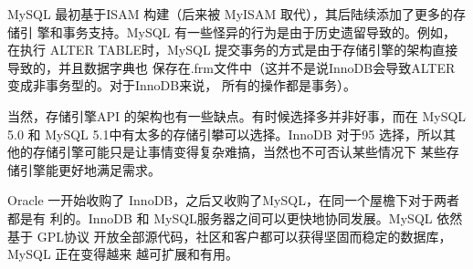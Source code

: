 MySQL 最初基于ISAM 构建（后来被 MyISAM 取代），其后陆续添加了更多的存储引
擎和事务支持。MySQL 有一些怪异的行为是由于历史遗留导致的。例如，在执行 ALTER
TABLE时，MySQL 提交事务的方式是由于存储引擎的架构直接导致的，并且数据字典也
保存在.frm文件中（这并不是说InnoDB会导致ALTER变成非事务型的。对于InnoDB来说，
所有的操作都是事务）。

当然，存储引擎API 的架构也有一些缺点。有时候选择多并非好事，而在 MySQL 5.0 和
MySQL 5.1中有太多的存储引攀可以选择。InnoDB 对于95%
选择，所以其他的存储引擎可能只是让事情变得复杂难搞，当然也不可否认某些情况下
某些存储引擎能更好地满足需求。

Oracle 一开始收购了 InnoDB，之后又收购了MySQL，在同一个屋檐下对于两者都是有
利的。InnoDB 和 MySQL服务器之间可以更快地协同发展。MySQL 依然基于 GPL协议
开放全部源代码，社区和客户都可以获得坚固而稳定的数据库，MySQL 正在变得越来
越可扩展和有用。


